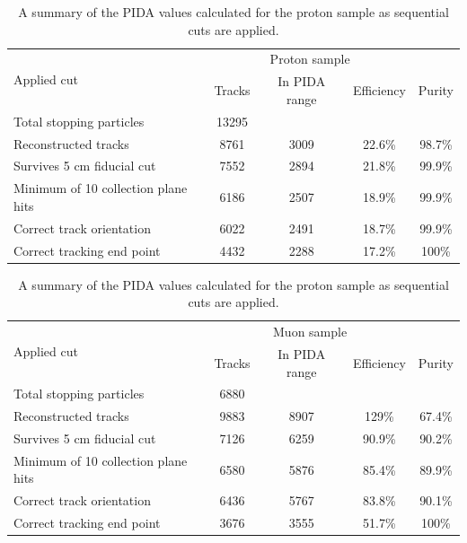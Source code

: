 \begin{table}
  \caption[A summary of the PIDA values calculated for the proton sample as sequential cuts are applied]
          {A summary of the PIDA values calculated for the proton sample as sequential cuts are applied.}
  \centering
  \label{tab:Isol_PIDA_Proton}
  \begin{tabular}{l c c c c}
    \toprule
    \multirow{2}{*}{Applied cut} & \multicolumn{3}{c}{Proton sample} \\ 
    \cmidrule{2-5}
      & Tracks & In PIDA range & Efficiency & Purity \\ 
    \midrule
      Total stopping particles            & 13295 &     &        & \\

      Reconstructed tracks                & 8761 & 3009 & 22.6\% & 98.7\% \\

      Survives 5 cm fiducial cut          & 7552 & 2894 & 21.8\% & 99.9\% \\

      Minimum of 10 collection plane hits & 6186 & 2507 & 18.9\% & 99.9\% \\

      Correct track orientation           & 6022 & 2491 & 18.7\% & 99.9\% \\

      Correct tracking end point          & 4432 & 2288 & 17.2\% & 100\% \\
    \bottomrule
  \end{tabular}
\end{table}

\begin{table}
  \caption[A summary of the PIDA values calculated for the proton sample as sequential cuts are applied]
          {A summary of the PIDA values calculated for the proton sample as sequential cuts are applied.}
  \centering
  \label{tab:Isol_PIDA_Muon}
  \begin{tabular}{l c c c c}
    \toprule
    \multirow{2}{*}{Applied cut} & \multicolumn{3}{c}{Muon sample} \\ 
    \cmidrule{2-5}
      & Tracks & In PIDA range & Efficiency & Purity \\ 
    \midrule
      Total stopping particles            & 6880 &      &        & \\

      Reconstructed tracks                & 9883 & 8907 & 129\%  & 67.4\% \\

      Survives 5 cm fiducial cut          & 7126 & 6259 & 90.9\% & 90.2\% \\

      Minimum of 10 collection plane hits & 6580 & 5876 & 85.4\% & 89.9\% \\

      Correct track orientation           & 6436 & 5767 & 83.8\% & 90.1\% \\

      Correct tracking end point          & 3676 & 3555 & 51.7\% & 100\%  \\
    \bottomrule
  \end{tabular}
\end{table}

